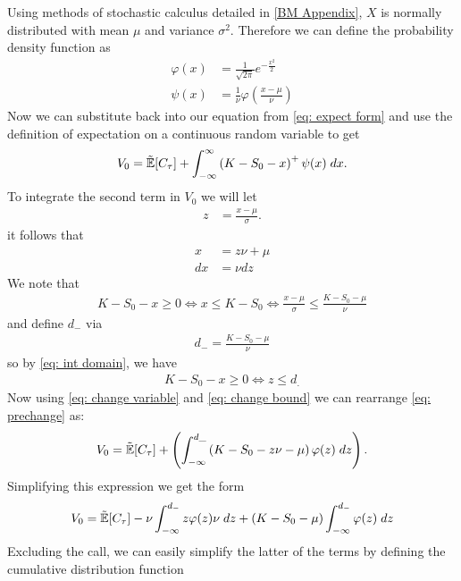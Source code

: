\documentclass[reqno]{amsart}
\begin{document}
Using methods of stochastic calculus detailed in \eqref{BM Appendix}, $X$ is normally distributed with mean $\mu$ and variance $\sigma^2$. Therefore we can define the probability density function as
\begin{align}
     \label{eq: phi-PDF}
     \varphi(x) &=\frac{1}{\sqrt{2\pi}}e^{-\frac{x^2}{2}}\\
     \psi(x) &= \frac{1}{\nu}\varphi(\frac{x-\mu}{\nu})
\end{align}
Now we can substitute back into our equation from \eqref{eq: expect form} and use the definition of expectation on a continuous random variable to get 
\begin{align} \label{eq: prechange}
     V_0 = \tilde{\mathbb{E}}[C_\tau] + \int_{-\infty}^{\infty}\left(K- S_0 - x\right)^+ \psi(x) \; dx.
\end{align}
To integrate the second term in $V_0$ we will let
\begin{align}
     z &= \frac{x-\mu}{\sigma}.
\end{align}
it follows that 
\begin{align}\label{eq: change variable}
     x &= z\nu + \mu\\
     dx &= \nu dz
\end{align}
We note that 
\begin{align} \label{eq: int domain}
    K - S_0 - x \ge 0 \Longleftrightarrow x \leq K- S_0 \Longleftrightarrow  \frac{x-\mu}{\sigma} \leq \frac{K-S_0-\mu}{\nu}
\end{align}
and define $d_-$ via
\begin{align}
      d_- =  \frac{K-S_0-\mu}{\nu}
\end{align}
so by \eqref{eq: int domain}, we have 
\begin{align} \label{eq: change bound}
     K - S_0 - x \ge 0  \Longleftrightarrow z \leq d_.
\end{align}
Now using \eqref{eq: change variable} and \eqref{eq: change bound} we can rearrange \eqref{eq: prechange} as:
\begin{align}
     V_0 = \tilde{\mathbb{E}}[C_\tau] + \left(\int_{-\infty}^{d\_}\left(K- S_0 - z\nu - \mu\right)\varphi(z) \; dz\right).
\end{align}
Simplifying this expression we get the form
\begin{align}
     V_0 = \tilde{\mathbb{E}}[C_\tau] - \nu \int_{-\infty}^{d_-}z\varphi(z)\nu \; dz +  (K- S_0 - \mu)\int_{-\infty}^{d_-}\varphi(z) \; dz 
\end{align}
Excluding the call, we can easily simplify the latter of the terms by defining the cumulative distribution function
\end{document}

